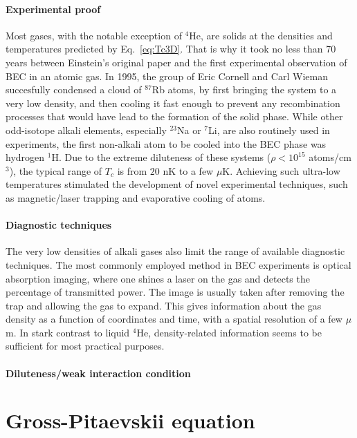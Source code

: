 \paragraph{Experimental proof}
Most gases, with the notable exception of ${}^4$He, are solids at the
densities and temperatures predicted by Eq.~\eqref{eq:Tc3D}. That is
why it took no less than 70 years between Einstein's original paper
and the first experimental observation of BEC in an atomic gas. In
1995, the group of Eric Cornell and Carl Wieman succesfully condensed
a cloud of ${}^{87}$Rb atoms, by first bringing the system to a very
low density, and then cooling it fast enough to prevent any
recombination processes that would have lead to the formation of the
solid phase. While other odd-isotope alkali elements, especially
${}^{23}$Na or ${}^{7}$Li, are also routinely used in experiments, the
first non-alkali atom to be cooled into the BEC phase was hydrogen
${}^1$H. Due to the extreme diluteness of these systems
($\rho < 10^{15}$ atoms/cm${}^3$), the typical range of $T_c$ is from
$20$ nK to a few $\mu$K. Achieving such ultra-low temperatures
stimulated the development of novel experimental techniques, such as
magnetic/laser trapping and evaporative cooling of atoms.

\paragraph{Diagnostic techniques}
The very low densities of alkali gases also limit the range of
available diagnostic techniques. The most commonly employed method in
BEC experiments is optical absorption imaging, where one shines a
laser on the gas and detects the percentage of transmitted power. The
image is usually taken after removing the trap and allowing the gas to
expand. This gives information about the gas density as a function of
coordinates and time, with a spatial resolution of a few $\mu$m. In
stark contrast to liquid ${}^4$He, density-related information seems
to be sufficient for most practical purposes.

\paragraph{Diluteness/weak interaction condition}


\section{Gross-Pitaevskii equation}
\label{sec:GPE}

